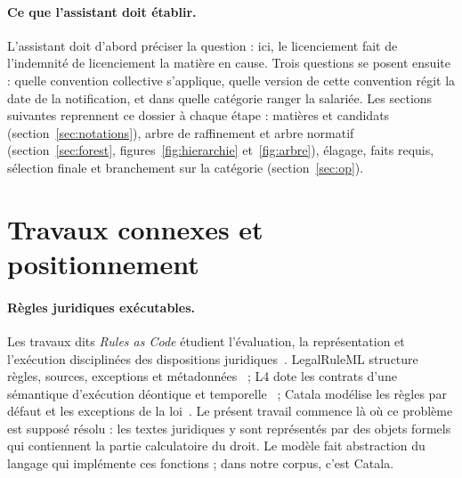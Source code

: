 \documentclass[review]{jflart}
\begin{document}
\paragraph{Ce que l'assistant doit établir.}
L'assistant doit d'abord préciser la question : ici, le licenciement fait de
l'indemnité de licenciement la matière en cause. Trois questions se posent
ensuite : quelle convention collective s'applique, quelle version de cette
convention régit la date de la notification, et dans quelle catégorie ranger
la salariée. Les sections suivantes reprennent ce dossier à chaque étape :
matières et candidats (section~\ref{sec:notations}), arbre de raffinement et arbre normatif (section~\ref{sec:forest}, figures~\ref{fig:hierarchie}
et~\ref{fig:arbre}), élagage, faits requis, sélection finale et branchement
sur la catégorie (section~\ref{sec:op}).

\section{Travaux connexes et positionnement}\label{sec:related}

\paragraph{Règles juridiques exécutables.}
Les travaux dits \emph{Rules as Code} étudient l'évaluation, la représentation
et l'exécution disciplinées des dispositions juridiques~\cite{ali2025}.
LegalRuleML structure règles, sources, exceptions et
métadonnées~\cite{nazarenko2016,legalruleml} ; L4 dote les contrats d'une
sémantique d'exécution déontique et temporelle~\cite{watt2023} ; Catala modélise
les règles par défaut et les exceptions de la loi~\cite{merigoux2021}. Le présent
travail commence là où ce problème est supposé résolu : les textes juridiques
y sont représentés par des objets formels qui contiennent la partie
calculatoire du droit. Le modèle fait abstraction du langage qui
implémente ces fonctions ; dans notre corpus, c'est Catala.
\end{document}
